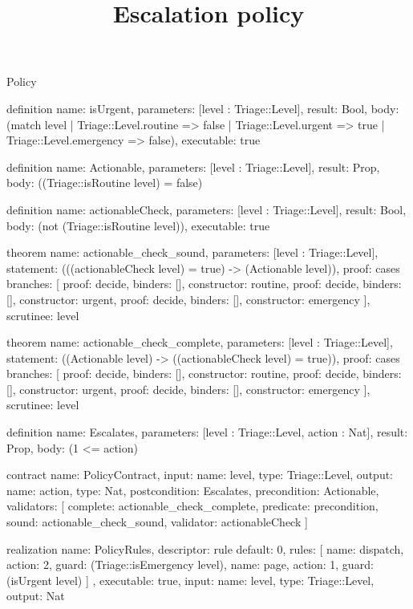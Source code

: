 \begin{lexlean}{Policy}
\title{Escalation policy}
\begin{semanticmodule}
definition{
  name: isUrgent,
  parameters: [level : Triage::Level],
  result: Bool,
  body: (match level
    | Triage::Level.routine => false
    | Triage::Level.urgent => true
    | Triage::Level.emergency => false),
  executable: true
}

definition{
  name: Actionable,
  parameters: [level : Triage::Level],
  result: Prop,
  body: ((Triage::isRoutine level) = false)
}

definition{
  name: actionableCheck,
  parameters: [level : Triage::Level],
  result: Bool,
  body: (not (Triage::isRoutine level)),
  executable: true
}

theorem{
  name: actionable_check_sound,
  parameters: [level : Triage::Level],
  statement: (((actionableCheck level) = true) -> (Actionable level)),
  proof: cases{
    branches: [
      {proof: decide{}, binders: [], constructor: routine},
      {proof: decide{}, binders: [], constructor: urgent},
      {proof: decide{}, binders: [], constructor: emergency}
    ],
    scrutinee: level
  }
}

theorem{
  name: actionable_check_complete,
  parameters: [level : Triage::Level],
  statement: ((Actionable level) -> ((actionableCheck level) = true)),
  proof: cases{
    branches: [
      {proof: decide{}, binders: [], constructor: routine},
      {proof: decide{}, binders: [], constructor: urgent},
      {proof: decide{}, binders: [], constructor: emergency}
    ],
    scrutinee: level
  }
}

definition{
  name: Escalates,
  parameters: [level : Triage::Level, action : Nat],
  result: Prop,
  body: (1 <= action)
}

contract{
  name: PolicyContract,
  input: {name: level, type: Triage::Level},
  output: {name: action, type: Nat},
  postcondition: Escalates,
  precondition: Actionable,
  validators: [
    {
      complete: actionable_check_complete,
      predicate: precondition,
      sound: actionable_check_sound,
      validator: actionableCheck
    }
  ]
}

realization{
  name: PolicyRules,
  descriptor: rule{
    default: 0,
    rules: [
      {name: dispatch, action: 2, guard: (Triage::isEmergency level)},
      {name: page, action: 1, guard: (isUrgent level)}
    ]
  },
  executable: true,
  input: {name: level, type: Triage::Level},
  output: Nat
}


\end{semanticmodule}
\end{lexlean}
